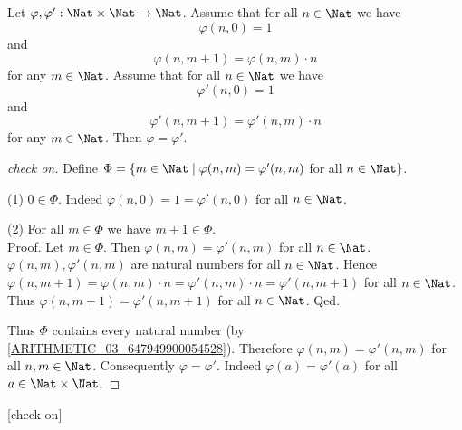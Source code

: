 \documentclass{article}
\begin{document}
  \begin{forthel}
    \begin{lemma}\label{exp_uniqueness}
      Let $\varphi, \varphi' : \Nat \times \Nat \to \Nat$.
      Assume that for all $n \in \Nat$ we have
      \[\varphi(n, 0) = 1\]
      and
      \[\varphi(n, m + 1) = \varphi(n,m) \cdot n\]
      for any $m \in \Nat$.
      Assume that for all $n \in \Nat$ we have
      \[\varphi'(n, 0) = 1\]
      and
      \[\varphi'(n, m + 1) = \varphi'(n,m) \cdot n\]
      for any $m \in \Nat$.
      Then $\varphi = \varphi'$.
    \end{lemma}
    \begin{proof}
      [check on]
      Define $\Phi = \{ m \in \Nat \mid \varphi(n,m) = \varphi'(n,m)$ for
      all $n \in \Nat \}$.

      (1) $0 \in \Phi$.
      Indeed $\varphi(n,0) = 1 = \varphi'(n,0)$ for all $n \in \Nat$.

      (2) For all $m \in \Phi$ we have $m + 1 \in \Phi$. \\
      Proof.
        Let $m \in \Phi$.
        Then $\varphi(n,m) = \varphi'(n,m)$ for all $n \in \Nat$.
        $\varphi(n,m), \varphi'(n,m)$ are natural numbers for all $n \in \Nat$. %
        Hence $\varphi(n, m + 1)
          = \varphi(n,m) \cdot n
          = \varphi'(n,m) \cdot n
          = \varphi'(n, m + 1)$
        for all $n \in \Nat$.
        Thus $\varphi(n,m + 1) = \varphi'(n,m + 1)$ for all $n \in \Nat$.
      Qed.

      Thus $\Phi$ contains every natural number (by \cref{ARITHMETIC_03_647949900054528}).
      Therefore $\varphi(n,m) = \varphi'(n,m)$ for all $n, m \in \Nat$.
      Consequently $\varphi = \varphi'$.
      Indeed $\varphi(a) = \varphi'(a)$ for all $a \in \Nat \times \Nat$.
    \end{proof}
    [check on]
  \end{forthel}
\end{document}
